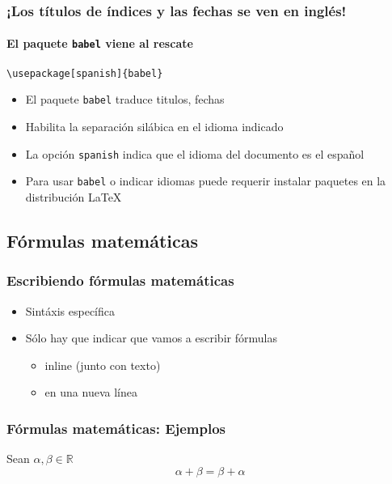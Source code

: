 \documentclass[svgnames]{beamer}
\begin{document}
\begin{frame}[fragile]
  \frametitle{¡Los títulos de índices y las fechas se ven en inglés!}
  \framesubtitle{El paquete \texttt{babel} viene al rescate}

  \begin{lstlisting}[style=latex]
\usepackage[spanish]{babel}
  \end{lstlisting}

  \begin{itemize}
    \item El paquete \texttt{babel} traduce titulos, fechas
    \item Habilita la separación silábica en el idioma indicado
    \item La opción \texttt{spanish} indica que el idioma del documento es el español
    \item Para usar \texttt{babel} o indicar idiomas puede requerir instalar paquetes en la distribución \LaTeX
  \end{itemize}
\end{frame}

\subsection{Fórmulas matemáticas}
\begin{frame}
  \frametitle{Escribiendo fórmulas matemáticas}
  \begin{itemize}
    \item Sintáxis específica
    \item Sólo hay que indicar que vamos a escribir fórmulas
    \begin{itemize}
     \item inline (junto con texto)
     \item en una nueva línea
    \end{itemize}
   \end{itemize}
\end{frame}

\begin{frame}
  \frametitle{Fórmulas matemáticas: Ejemplos}
   {}
   {Sean $ \alpha, \beta \in \mathbb{R} $\begin{equation*} \alpha + \beta = \beta + \alpha\end{equation*} }      
\end{frame}
\end{document}
